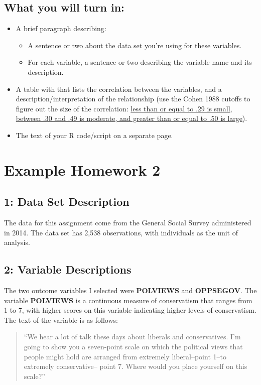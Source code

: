\documentclass{article}
\begin{document}
\subsection*{What you will turn in:}
\begin{itemize}
\item A brief paragraph describing:
	\begin{itemize}
	\item A sentence or two about the data set you're using for these variables.
	\item For each variable, a sentence or two describing the variable name and its description.
	\end{itemize}	
\item A table with that lists the correlation between the variables, and a description/interpretation of the relationship (use the Cohen 1988 cutoffs to figure out the size of the correlation: \href{http://www.psychology.emory.edu/clinical/bliwise/Tutorials/SCATTER/scatterplots/effect.htm}{less than or equal to .29 is small, between .30 and .49 is moderate, and greater than or equal to .50 is large}). 
\item The text of your R code/script on a separate page.
\end{itemize}

\newpage
\section*{\center Example Homework 2}

\subsection*{1: Data Set Description}
The data for this assignment come from the General Social Survey administered in 2014. The data set has 2,538 observations, with individuals as the unit of analysis. \newline

\subsection*{2: Variable Descriptions}
The two outcome variables I selected were \textbf{POLVIEWS} and \textbf{OPPSEGOV}. The variable \textbf{POLVIEWS} is a continuous measure of conservatism that ranges from 1 to 7, with higher scores on this variable indicating higher levels of conservatism. The text of the variable is as follows:
\begin{quote}
``We hear a lot of talk these days about liberals and conservatives. I'm going to show you a seven-point scale on which the political views that people might hold are arranged from extremely liberal--point 1--to extremely conservative-- point 7. Where would you place yourself on this scale?''
\end{quote}
\end{document}
